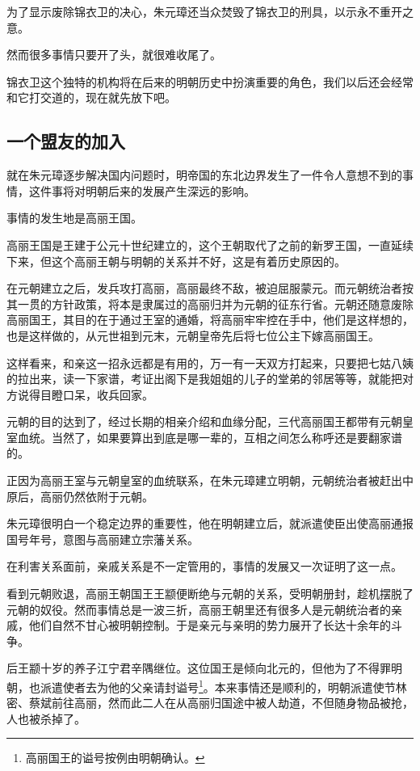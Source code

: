 \begin{multicols}{\theparacolNo}
		为了显示废除锦衣卫的决心，朱元璋还当众焚毁了锦衣卫的刑具，以示永不重开之意。

		然而很多事情只要开了头，就很难收尾了。

		锦衣卫这个独特的机构将在后来的明朝历史中扮演重要的角色，我们以后还会经常和它打交道的，现在就先放下吧。

		\subsection{一个盟友的加入}
		就在朱元璋逐步解决国内问题时，明帝国的东北边界发生了一件令人意想不到的事情，这件事将对明朝后来的发展产生深远的影响。

		事情的发生地是高丽王国。

		高丽王国是王建于公元十世纪建立的，这个王朝取代了之前的新罗王国，一直延续下来，但这个高丽王朝与明朝的关系并不好，这是有着历史原因的。

		在元朝建立之后，发兵攻打高丽，高丽最终不敌，被迫屈服蒙元。而元朝统治者按其一贯的方针政策，将本是隶属过的高丽归并为元朝的征东行省。元朝还随意废除高丽国王，其目的在于通过王室的通婚，将高丽牢牢控在手中，他们是这样想的，也是这样做的，从元世祖到元末，元朝皇帝先后将七位公主下嫁高丽国王。

		这样看来，和亲这一招永远都是有用的，万一有一天双方打起来，只要把七姑八姨的拉出来，读一下家谱，考证出阁下是我姐姐的儿子的堂弟的邻居等等，就能把对方说得目瞪口呆，收兵回家。

		元朝的目的达到了，经过长期的相亲介绍和血缘分配，三代高丽国王都带有元朝皇室血统。当然了，如果要算出到底是哪一辈的，互相之间怎么称呼还是要翻家谱的。

		正因为高丽王室与元朝皇室的血统联系，在朱元璋建立明朝，元朝统治者被赶出中原后，高丽仍然依附于元朝。

		朱元璋很明白一个稳定边界的重要性，他在明朝建立后，就派遣使臣出使高丽通报国号年号，意图与高丽建立宗藩关系。

		在利害关系面前，亲戚关系是不一定管用的，事情的发展又一次证明了这一点。

		看到元朝败退，高丽王朝国王王颛便断绝与元朝的关系，受明朝册封，趁机摆脱了元朝的奴役。然而事情总是一波三折，高丽王朝里还有很多人是元朝统治者的亲戚，他们自然不甘心被明朝控制。于是亲元与亲明的势力展开了长达十余年的斗争。

		后王颛十岁的养子江宁君辛隅继位。这位国王是倾向北元的，但他为了不得罪明朝，也派遣使者去为他的父亲请封谥号\footnote{高丽国王的谥号按例由明朝确认。}。本来事情还是顺利的，明朝派遣使节林密、蔡斌前往高丽，然而此二人在从高丽归国途中被人劫道，不但随身物品被抢，人也被杀掉了。


\end{multicols}
